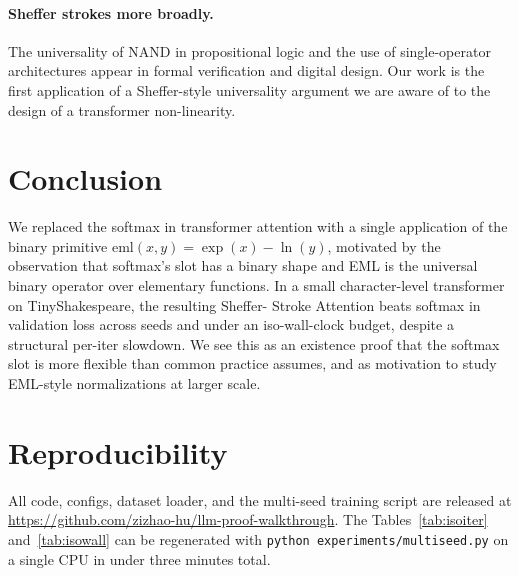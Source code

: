 \documentclass{article}
\begin{document}
\paragraph{Sheffer strokes more broadly.} The universality of NAND in
propositional logic and the use of single-operator architectures appear
in formal verification and digital design. Our work is the first
application of a Sheffer-style universality argument we are aware of to
the design of a transformer non-linearity.

\section{Conclusion}

We replaced the softmax in transformer attention with a single application
of the binary primitive $\mathrm{eml}(x, y) = \exp(x) - \ln(y)$, motivated
by the observation that softmax's slot has a binary shape and EML is the
universal binary operator over elementary functions. In a small
character-level transformer on TinyShakespeare, the resulting Sheffer-
Stroke Attention beats softmax in validation loss across seeds and under
an iso-wall-clock budget, despite a structural per-iter slowdown. We see
this as an existence proof that the softmax slot is more flexible than
common practice assumes, and as motivation to study EML-style
normalizations at larger scale.

\section*{Reproducibility}
All code, configs, dataset loader, and the multi-seed training script are
released at \url{https://github.com/zizhao-hu/llm-proof-walkthrough}. The
Tables~\ref{tab:isoiter} and~\ref{tab:isowall} can be regenerated with
\texttt{python experiments/multiseed.py} on a single CPU in under three
minutes total.



\end{document}
